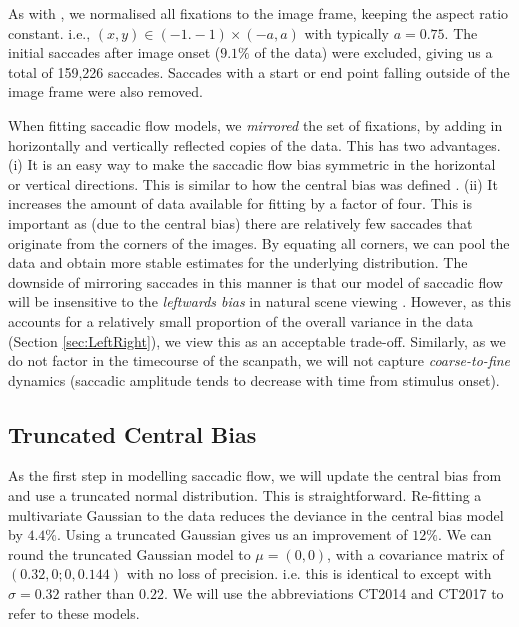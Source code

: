 \documentclass[a4paper, twocolumn, oneside, 11pt]{article}
\begin{document}
As with \cite{clarke-tatler2014}, we normalised all fixations to the image frame, keeping the aspect ratio constant. i.e., $(x,y)\in (-1.-1)\times(-a,a)$ with typically $a=0.75$. The initial saccades after image onset ($9.1\%$ of the data) were excluded, giving us a total of 159,226 saccades. Saccades with a start or end point falling outside of the image frame were also removed. 

When fitting saccadic flow models, we \textit{mirrored} the set of fixations, by adding in horizontally and vertically reflected copies of the data. This has two advantages. (i) It is an easy way to make the saccadic flow bias symmetric in the horizontal or vertical directions. This is similar to how the central bias was defined \cite{clarke-tatler2014}. (ii) It increases the amount of data available for fitting by a factor of four. This is important as (due to the central bias) there are relatively few saccades that originate from the corners of the images. By equating all corners, we can pool the data and obtain more stable estimates for the underlying distribution. The downside of mirroring saccades in this manner is that our model of saccadic flow will be insensitive to the \textit{leftwards bias} in natural scene viewing \citep{nuthmann-matthias2014}. However, as this accounts for a relatively small proportion of the overall variance in the data (Section \ref{sec:LeftRight}), we view this as an acceptable trade-off. Similarly, as we do not factor in the timecourse of the scanpath, we will not capture \textit{coarse-to-fine} dynamics (saccadic amplitude tends to decrease with time from stimulus onset).


\subsection{Truncated Central Bias}
\label{sec:truncatedCentral}

As the first step in modelling saccadic flow, we will update the central bias from \cite{clarke-tatler2014} and use a truncated normal distribution. This is straightforward. Re-fitting a multivariate Gaussian to the data reduces the deviance in the central bias model by $4.4\%$. Using a truncated Gaussian gives us an improvement of $12\%$. We can round the truncated Gaussian model to $\mu = (0,0)$, with a covariance matrix of $(0.32, 0; 0, 0.144)$ with no loss of precision. i.e. this is identical to \cite{clarke-tatler2014} except with $\sigma=0.32$ rather than $0.22$. We will use the abbreviations CT2014 and CT2017 to refer to these models.
\end{document}
